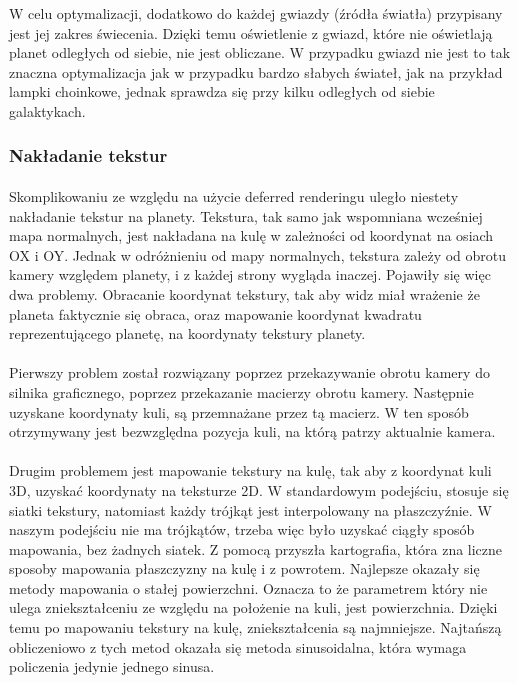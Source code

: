 W celu optymalizacji, dodatkowo do każdej gwiazdy (źródła światła) przypisany jest jej zakres świecenia. Dzięki temu oświetlenie z gwiazd, które nie oświetlają planet odległych od siebie, nie jest obliczane. W przypadku gwiazd nie jest to tak znaczna optymalizacja jak w przypadku bardzo słabych świateł, jak na przykład lampki choinkowe, jednak sprawdza się przy kilku odległych od siebie galaktykach.

\subsubsection{Nakładanie tekstur}\label{ssub:nakladanie tekstur}
\paragraph{}

Skomplikowaniu ze względu na użycie deferred renderingu uległo niestety nakładanie tekstur na planety. Tekstura, tak samo jak wspomniana wcześniej mapa normalnych, jest nakładana na kulę w zależności od koordynat na osiach OX i OY. Jednak w odróżnieniu od mapy normalnych, tekstura zależy od obrotu kamery względem planety, i z każdej strony wygląda inaczej. Pojawiły się więc dwa problemy. Obracanie koordynat tekstury, tak aby widz miał wrażenie że planeta faktycznie się obraca, oraz mapowanie koordynat kwadratu reprezentującego planetę, na koordynaty tekstury planety.

\paragraph{}

Pierwszy problem został rozwiązany poprzez przekazywanie obrotu kamery do silnika graficznego, poprzez przekazanie macierzy obrotu kamery. Następnie uzyskane koordynaty kuli, są przemnażane przez tą macierz. W ten sposób otrzymywany jest bezwzględna pozycja kuli, na którą patrzy aktualnie kamera.

\paragraph{}

Drugim problemem jest mapowanie tekstury na kulę, tak aby z koordynat kuli 3D, uzyskać koordynaty na teksturze 2D. W standardowym podejściu, stosuje się siatki tekstury, natomiast każdy trójkąt jest interpolowany na płaszczyźnie. W naszym podejściu nie ma trójkątów, trzeba więc było uzyskać ciągły sposób mapowania, bez żadnych siatek. Z pomocą przyszła kartografia, która zna liczne sposoby mapowania płaszczyzny na kulę i z powrotem. Najlepsze okazały się metody mapowania o stałej powierzchni. Oznacza to że parametrem który nie ulega zniekształceniu ze względu na położenie na kuli, jest powierzchnia. Dzięki temu po mapowaniu tekstury na kulę, zniekształcenia są najmniejsze. Najtańszą obliczeniowo z tych metod okazała się metoda sinusoidalna, która wymaga policzenia jedynie jednego sinusa.

